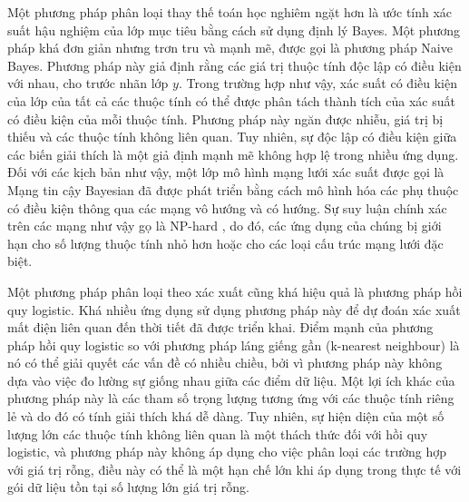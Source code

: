 \documentclass[utf8]{frontiersSCNS} %
\begin{document}
Một phương pháp phân loại thay thế toán học nghiêm ngặt hơn là ước tính xác suất hậu nghiệm của lớp mục tiêu bằng cách sử dụng định lý Bayes. Một phương pháp khá đơn giản nhưng trơn tru và mạnh mẽ, được gọi là phương pháp Naive Bayes. Phương pháp này giả định rằng các giá trị thuộc tính độc lập có điều kiện với nhau, cho trước nhãn lớp $y$. Trong trường hợp như vậy, xác suất có điều kiện của lớp của tất cả các thuộc tính có thể được phân tách thành tích của xác suất có điều kiện của mỗi thuộc tính. Phương pháp này ngăn được nhiễu, giá trị bị thiếu và các thuộc tính không liên quan. Tuy nhiên, sự độc lập có điều kiện giữa các biến giải thích là một giả định mạnh mẽ không hợp lệ trong nhiều ứng dụng. Đối với các kịch bản như vậy, một lớp mô hình mạng lưới xác suất được gọi là Mạng tin cậy Bayesian đã được phát triển bằng cách mô hình hóa các phụ thuộc có điều kiện thông qua các mạng vô hướng và có hướng. Sự suy luận chính xác trên các mạng như vậy gọ là NP-hard \citep{Cooper1990}, do đó, các ứng dụng của chúng bị giới hạn cho số lượng thuộc tính nhỏ hơn hoặc cho các loại cấu trúc mạng lưới đặc biệt.

Một phương pháp phân loại theo xác xuất cũng khá hiệu quả là phương pháp hồi quy logistic. Khá nhiều ứng dụng sử dụng phương pháp này để dự đoán xác xuất mất điện liên quan đến thời tiết đã được triển khai. Điểm mạnh của phương pháp hồi quy logistic so với phương pháp láng giếng gần (k-nearest neighbour) là nó có thể giải quyết các vấn đề có nhiều chiều, bởi vì phương pháp này không dựa vào việc đo lường sự giống nhau giữa các điểm dữ liệu. Một lợi ích khác của phương pháp này là các tham số trọng lượng tương ứng với các thuộc tính riêng lẻ và do đó có tính giải thích khá dễ dàng. Tuy nhiên, sự hiện diện của một số lượng lớn các thuộc tính không liên quan là một thách thức đối với hồi quy logistic, và phương pháp này không áp dụng cho việc phân loại các trường hợp với giá trị rỗng, điều này có thể là một hạn chế lớn khi áp dụng trong thực tế với gói dữ liệu tồn tại số lượng lớn giá trị rỗng.
\end{document}
